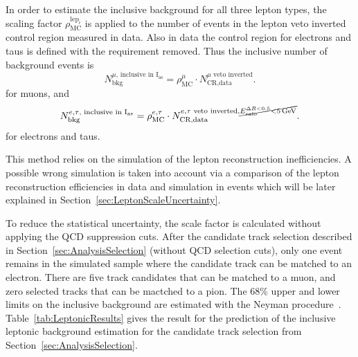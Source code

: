 In order to estimate the inclusive background for all three lepton types, the scaling factor $\rho_{\text{MC}}^{\text{lep}_i}$ is applied to the number of events in the lepton veto inverted control region measured in data.
Also in data the control region for electrons and taus is defined with the \ecalo requirement removed. 
Thus the inclusive number of background events is 
\begin{equation*}
N^{\mu \text{, inclusive in I$_{\text{as}}$}}_{\text{bkg}} = \rho_{\text{MC}}^{\mu} \cdot N_{\text{CR,data}}^{\mu\text{ veto inverted}}.
\end{equation*}
for muons, and 
\begin{equation*}
N^{e,\tau\text{, inclusive in I$_{\text{as}}$}}_{\text{bkg}} = \rho_{\text{MC}}^{e,\tau} \cdot N_{\text{CR,data}}^{e,\tau\text{ veto inverted}, \cancel{E^{\Delta R<0.5}_{\text{calo}}<5\,\text{Ge}\kern-0.06667em\text{V}}}.
\end{equation*}
for electrons and taus.

This method relies on the simulation of the lepton reconstruction inefficiencies.
A possible wrong simulation is taken into account via a comparison of the lepton reconstruction efficiencies in data and simulation in \Zlep events which will be later explained in Section~\ref{sec:LeptonScaleUncertainty}.

To reduce the statistical uncertainty, the scale factor is calculated without applying the QCD suppression cuts. 
After the candidate track selection described in Section~\ref{sec:AnalysisSelection} (without QCD selection cuts), only one event remains in the simulated \WJets sample where the candidate track can be matched to an electron.
There are five track candidates that can be matched to a muon, and zero selected tracks that can be mactched to a pion.
The 68\% upper and lower limits on the inclusive background are estimated with the Neyman procedure~\cite{bib:PDG_2014}.
Table~\ref{tab:LeptonicResults} gives the result for the prediction of the inclusive leptonic background estimation for the candidate track selection from Section~\ref{sec:AnalysisSelection}.

